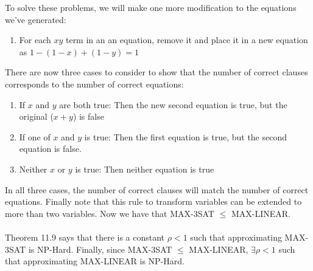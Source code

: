 \documentclass[letterpaper,notitlepage,twoside]{article}
\begin{document}
To solve these problems, we will make one more modification to the equations we've generated:
\begin{enumerate}
\item For each $xy$ term in an an equation, remove it and place it in a new equation as $1 - (1 - x) + (1 - y) = 1$
\end{enumerate}
There are now three cases to consider to show that the number of correct clauses corresponds to the number of correct equations:
\begin{enumerate}
\item If $x$ and $y$ are both true: Then the new second equation is true, but the original ($x + y$) is false
\item If one of $x$ and $y$ is true: Then the first equation is true, but the second equation is false.
\item Neither $x$ or $y$ is true: Then neither equation is true
\end{enumerate}
In all three cases, the number of correct clauses will match the number of correct equations. Finally note that this rule to transform variables can be extended to more than two variables. Now we have that MAX-3SAT $\leq$ MAX-LINEAR.
\\\\
Theorem 11.9 says that there is a constant $\rho < 1$ such that approximating MAX-3SAT is NP-Hard. Finally, since MAX-3SAT $\leq$ MAX-LINEAR, $\exists \rho < 1$ such that approximating MAX-LINEAR is NP-Hard.
\end{document}

